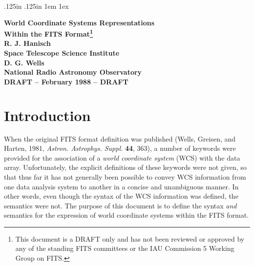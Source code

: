 \topmargin 0in
\oddsidemargin 0in
\evensidemargin 0in
\headheight .125in
\footheight .125in
\textheight 9.0in
\textwidth 6.5in
\parindent 1em  %
\parskip 1ex    %

%


\pagestyle{plain}
\thispagestyle{empty}


\begin{center} \Large \bf
World Coordinate Systems Representations\\
Within the FITS Format\footnote{This document is a DRAFT only and has not
been reviewed or approved by any of the standing FITS committees or the
IAU Commission 5 Working Group on FITS.}\\
\large
\vspace*{2ex}
R. J. Hanisch\\
Space Telescope Science Institute\\
D. G. Wells\\
National Radio Astronomy Observatory\\
\vspace*{2ex}
DRAFT -- February 1988 -- DRAFT\\
\end{center}


\section{Introduction}
When the original FITS format definition was published (Wells, Greisen, and
Harten, 1981, {\it Astron. Astrophys. Suppl.} {\bf 44}, 363), a number of
keywords were provided for the association of a {\it world coordinate system}
(WCS) with the data array.  Unfortunately, the explicit definitions of these
keywords were not given, so that thus far it has not generally been possible to
convey WCS information from one data analysis system to another in a concise
and unambiguous manner.  In other words, even though the syntax of the WCS
information was defined, the semantics were not.  The purpose of this document
is to define the syntax {\it and} semantics for the expression of world
coordinate systems within the FITS format. 

